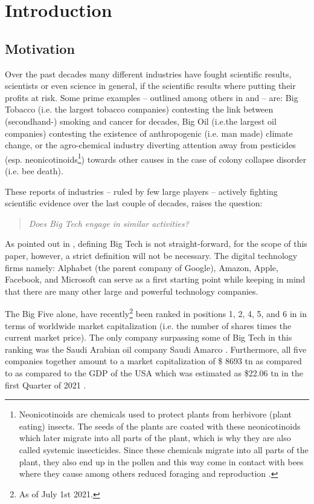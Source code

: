 \section{Introduction}
\label{sec:intro}

\subsection{Motivation}
Over the past decades many different industries have fought scientific results, scientists or even science in general, if the scientific results where putting their profits at risk. 
Some prime examples -- outlined among others in \citet{oreskes_merchants_2010} and \citet{cuveillier_forschung_2020} -- are: 
Big Tobacco (i.e. the largest tobacco companies) contesting the link between (secondhand-) smoking and cancer for decades, 
Big Oil (i.e.the largest oil companies) contesting the existence of anthropogenic (i.e. man made) climate change, 
or the agro-chemical industry diverting attention away from pesticides (esp. neonicotinoids\footnote{Neonicotinoids are chemicals used to protect plants from herbivore (plant eating) insects. The seeds of the plants are coated with these neonicotinoids which later migrate into all parts of the plant, which is why they are also called systemic insecticides. Since these chemicals migrate into all parts of the plant, they also end up in the pollen and this way come in contact with bees where they cause among others reduced foraging and reproduction \citep{whitehorn_neonicotinoid_2012}.}) towards other causes in the case of colony collapse disorder (i.e. bee death).


These reports of industries -- ruled by few large players -- actively fighting scientific evidence over the last couple of decades, raises the question:
\begin{quote}
\itshape
Does Big Tech engage in similar activities?
\end{quote}

As pointed out in \citep{abdalla_grey_2021}, defining Big Tech is not straight-forward, for the scope of this paper, however, a strict definition will not be necessary.
The  digital technology firms namely: Alphabet (the parent company of Google), Amazon, Apple, Facebook, and Microsoft can serve as a first starting point while keeping in mind that there are many other large and powerful technology companies.

The Big Five alone, have recently\footnote{As of July 1st 2021.} been ranked in positions 1, 2, 4, 5, and 6 in in terms of worldwide market capitalization (i.e. the number of shares times the current market price).
The only company surpassing some of Big Tech in this ranking was the Saudi Arabian oil company Saudi Amarco \citep{noauthor_largest_2021}. 
Furthermore, all five companies together amount to a market capitalization of \$ 8693 \gls{tn} as compared to as compared to the GDP of the USA which was estimated as \$22.06 \gls{tn} in the first Quarter of 2021 \citep{noauthor_gross_2021}.

